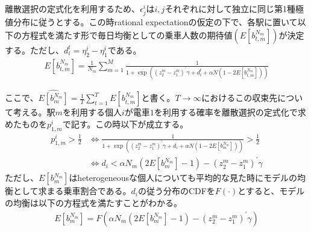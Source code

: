\documentclass{jsarticle}
\begin{document}
離散選択の定式化を利用するため、$\epsilon_j^i$は$i, j$それぞれに対して独立に同じ第1種極値分布に従うとする。この時rational expectationの仮定の下で、各駅に置いて以下の方程式を満たす形で毎日均衡としての乗車人数の期待値$(E[b_{t,m}^{N_m}])$が決定する。ただし、$d_i^t = \eta_2^i - \eta_1^i$である。
\begin{align*}
	E[b_{t,m}^{N_m}] = \frac{1}{N_m} \sum_{m = 1}^M \frac{1}{1 + \exp\left( (z_2^m - z_1^m)^{'}\gamma + d_i^t + \alpha N \left(1 - 2E[b_{t,m}^{N_m}]\right) \right)}
\end{align*}

ここで、$\widehat{E[b_m^{N_m}]} = \frac{1}{T} \sum_{t = 1}^T E[b_{t,m}^{N_m}]$と書く。$T \to \infty$におけるこの収束先について考える。駅$m$を利用する個人$i$が電車$1$を利用する確率を離散選択の定式化で求めたものを$p_{1,m}^i$で記す。この時以下が成立する。
\begin{align*}
	p_{1,m}^i > \frac{1}{2} &\Leftrightarrow \frac{1}{1 + \exp\left( (z_2^m - z_1^m)^{'}\gamma + d_i + \alpha N \left(1 - 2E[b_m^{N_m}]\right) \right)} > \frac{1}{2}\\[8pt]
	&\Leftrightarrow d_i < \alpha N_m \left(2E[b_m^{N_m}] - 1\right) - (z_2^m - z_1^m)^{'}\gamma
\end{align*}
ただし、$E[b_m^{N_m}]$はheterogeneousな個人についても平均的な見た時にモデルの均衡として求まる乗車割合である。$d_i$の従う分布のCDFを$F(\cdot)$とすると、モデルの均衡は以下の方程式を満たすことがわかる。
\begin{align*}
	E[b_m^{N_m}] = F\left( \alpha N_m \left(2E[b_m^{N_m}] - 1\right) - (z_2^m - z_1^m)^{'}\gamma \right)
\end{align*}
\end{document}
